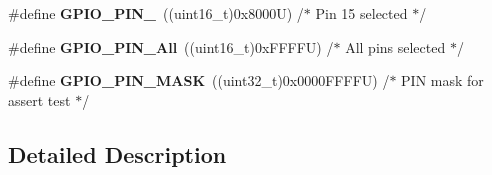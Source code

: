 \begin{DoxyCompactItemize}
\item 
\mbox{\label{group___g_p_i_o__pins__define_ga77be5756e80bcdf18e1aa39b35d1d640}} 
\#define {\bfseries G\+P\+I\+O\+\_\+\+P\+I\+N\+\_}~((uint16\+\_\+t)0x8000\+U)  /$\ast$ Pin 15 selected   $\ast$/
\item 
\mbox{\label{group___g_p_i_o__pins__define_gac04170878de13aa9785f6bd666c9faa5}} 
\#define {\bfseries G\+P\+I\+O\+\_\+\+P\+I\+N\+\_\+\+All}~((uint16\+\_\+t)0x\+F\+F\+F\+F\+U)  /$\ast$ All pins selected $\ast$/
\item 
\mbox{\label{group___g_p_i_o__pins__define_gab135afee57cdef0f647ab153f88b6d2f}} 
\#define {\bfseries G\+P\+I\+O\+\_\+\+P\+I\+N\+\_\+\+M\+A\+SK}~((uint32\+\_\+t)0x0000\+F\+F\+F\+F\+U) /$\ast$ P\+I\+N mask for assert test $\ast$/
\end{DoxyCompactItemize}


\subsection{Detailed Description}
